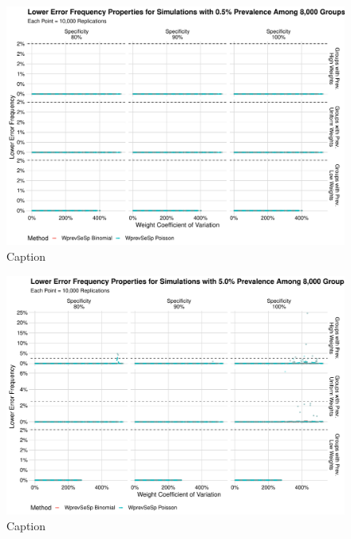 \documentclass[AMA,STIX1COL]{WileyNJD-v2}
\begin{document}
\begin{figure}
    \centering
    \includegraphics[width=\textwidth]{figures/imperfect_lower_error_frequency_8000_0_005_reduced.pdf}
    \caption{Caption}
    \label{fig:imperfect_lower_error_frequency_8000_0_005_reduced}
\end{figure}

\begin{figure}
    \centering
    \includegraphics[width=\textwidth]{figures/imperfect_lower_error_frequency_8000_0_05_reduced.pdf}
    \caption{Caption}
    \label{fig:imperfect_lower_error_frequency_8000_0_05_reduced.pdf}
\end{figure}
\end{document}
